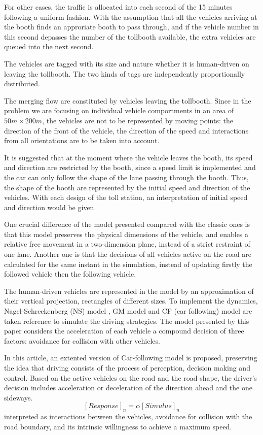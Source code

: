 \documentclass{mcmthesis}
\begin{document}
For other cases, the traffic is allocated into each second of the 15 minutes following a uniform fashion. With the assumption that all the vehicles arriving at the booth finds an approriate booth to pass through, and if the vehicle number in this second depasses the number of the tollbooth available, the extra vehicles are queued into the next second.

The vehicles are tagged with its size and nature whether it is human-driven on leaving the tollbooth. The two kinds of tags are independently proportionally distributed.

The merging flow are constituted by vehicles leaving the tollbooth. Since in the problem we are focusing on individual vehicle comportments in an area of $50m\times200m$, the vehicles are not to be represented by moving points: the direction of the front of the vehicle, the direction of the speed and interactions from all orientations are to be taken into account.

It is suggested that at the moment where the vehicle leaves the booth, its speed and direction are restricted by the booth, since a speed limit is implemented and the car can only follow the shape of the lane passing through the booth. Thus, the shape of the booth are represented by the initial speed and direction of the vehicles. With each design of the toll station, an interpretation of initial speed and direction would be given.

One crucial difference of the model presented compared with the classic ones is that this model preserves the physical dimensions of the vehicle, and enables a relative free movement in a two-dimension plane, instead of a strict restraint of one lane. Another one is that the decisions of all vehicles active on the road are calculated for the same instant in the simulation, instead of updating firstly the followed vehicle then the following vehicle.

The human-driven vehicles are represented in the model by an approximation of their vertical projection, rectangles of different sizes. To implement the dynamics, Nagel-Schreckenberg (NS) model \cite{acelluar}, GM model and CF (car following) model are taken reference to simulate the driving strategies. The model presented by this paper considers the acceleration of each vehicle a compound decision of three factors: avoidance for collision with other vehicles.


In this article, an extented version of Car-following model is proposed, preserving the idea that driving consists of the process of perception, decision making and control. Based on the active vehicles on the road and the road shape, the driver's decision includes acceleration or deceleration of the direction ahead and the one sideways.
$$[Response]_n= \alpha [Simulus]_n$$
 interpreted as interactions between the vehicles, avoidance for collision with the road boundary, and its intrinsic willingness to achieve a maximum speed. 
\end{document}
